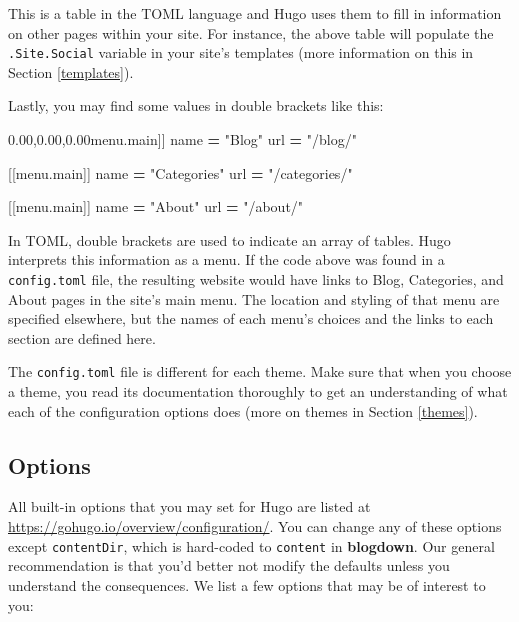 \documentclass[12pt,]{krantz}
\makeatletter
\newenvironment{Shaded}{\begin{snugshade}}{\end{snugshade}}
\newcommand{\StringTok}[1]{\textcolor[rgb]{0.31,0.60,0.02}{#1}}
\newcommand{\VariableTok}[1]{\textcolor[rgb]{0.00,0.00,0.00}{#1}}
\newcommand{\OperatorTok}[1]{\textcolor[rgb]{0.81,0.36,0.00}{\textbf{#1}}}
\newcommand{\AttributeTok}[1]{\textcolor[rgb]{0.77,0.63,0.00}{#1}}
\newcommand{\NormalTok}[1]{#1}
\newenvironment{kframe}{%
\medskip{}
\setlength{\fboxsep}{.8em}
 \def\at@end@of@kframe{}%
 \ifinner\ifhmode%
  \def\at@end@of@kframe{\end{minipage}}%
  \begin{minipage}{\columnwidth}%
 \fi\fi%
 \def\FrameCommand##1{\hskip\@totalleftmargin \hskip-\fboxsep
 \colorbox{shadecolor}{##1}\hskip-\fboxsep
     \hskip-\linewidth \hskip-\@totalleftmargin \hskip\columnwidth}%
 \MakeFramed {\advance\hsize-\width
   \@totalleftmargin\z@ \linewidth\hsize
   \@setminipage}}%
 {\par\unskip\endMakeFramed%
 \at@end@of@kframe}
\renewenvironment{Shaded}{\begin{kframe}}{\end{kframe}}
\theoremstyle{definition}
\theoremstyle{definition}
\theoremstyle{definition}
\theoremstyle{remark}
\makeatother
\begin{document}
This is a table in the TOML language and Hugo uses them to fill in
information on other pages within your site. For instance, the above
table will populate the \texttt{.Site.Social} variable in your site's
templates (more information on this in Section \ref{templates}).

Lastly, you may find some values in double brackets like this:

\begin{Shaded}
\begin{Highlighting}[]
\NormalTok{[[}\VariableTok{menu}\NormalTok{.}\AttributeTok{main}\NormalTok{]]}
\NormalTok{    name }\OperatorTok{=} \StringTok{"Blog"}
\NormalTok{    url }\OperatorTok{=} \StringTok{"/blog/"}

\NormalTok{[[}\VariableTok{menu}\NormalTok{.}\AttributeTok{main}\NormalTok{]]}
\NormalTok{    name }\OperatorTok{=} \StringTok{"Categories"}
\NormalTok{    url }\OperatorTok{=} \StringTok{"/categories/"}

\NormalTok{[[}\VariableTok{menu}\NormalTok{.}\AttributeTok{main}\NormalTok{]]}
\NormalTok{    name }\OperatorTok{=} \StringTok{"About"}
\NormalTok{    url }\OperatorTok{=} \StringTok{"/about/"}
\end{Highlighting}
\end{Shaded}

In TOML, double brackets are used to indicate an array of tables. Hugo
interprets this information as a menu. If the code above was found in a
\texttt{config.toml} file, the resulting website would have links to
Blog, Categories, and About pages in the site's main menu. The location
and styling of that menu are specified elsewhere, but the names of each
menu's choices and the links to each section are defined here.

The \texttt{config.toml} file is different for each theme. Make sure
that when you choose a theme, you read its documentation thoroughly to
get an understanding of what each of the configuration options does
(more on themes in Section \ref{themes}).

\subsection{Options}\label{options}

All built-in options that you may set for Hugo are listed
at \url{https://gohugo.io/overview/configuration/}. You can change any
of these options except \texttt{contentDir}, which is hard-coded to
\texttt{content} in \textbf{blogdown}. Our general recommendation is
that you'd better not modify the defaults unless you understand the
consequences. We list a few options that may be of interest to you:
\end{document}
